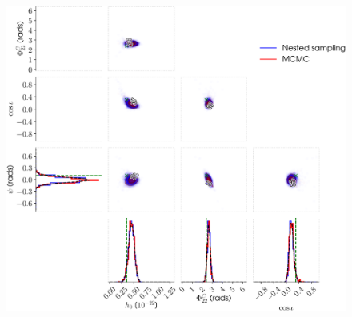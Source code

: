 \begin{figure}[!phtb]
\begin{center}
\includegraphics[width=1\columnwidth]{./figures/codeeval/simulations/signal_multidet/simulatedsignalmultitest}
\caption{ \protect}
\end{center}
\end{figure}


